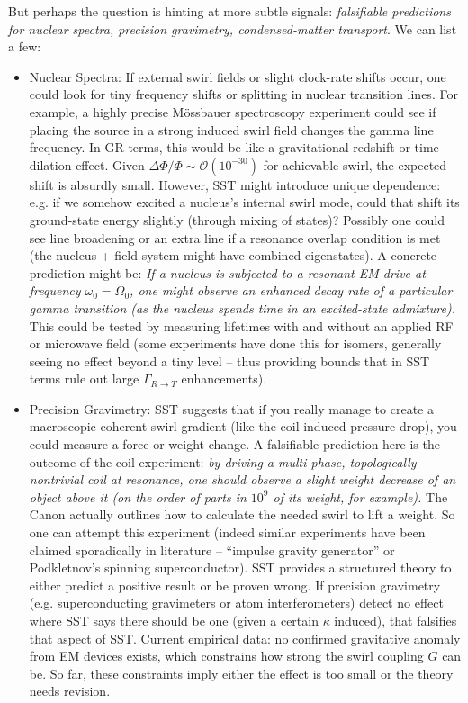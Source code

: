 \documentclass[11pt]{article}
\begin{document}
But perhaps the question is hinting at more subtle signals: \textit{falsifiable predictions for nuclear spectra, precision gravimetry, condensed-matter transport}. We can list a few:


\begin{itemize}

\item 
Nuclear Spectra: If external swirl fields or slight clock-rate shifts occur, one could look for tiny frequency shifts or splitting in nuclear transition lines. For example, a highly precise Mössbauer spectroscopy experiment could see if placing the source in a strong induced swirl field changes the gamma line frequency. In GR terms, this would be like a gravitational redshift or time-dilation effect. Given $\Delta\Phi/\Phi \sim \mathcal{O}(10^{-30})$ for achievable swirl, the expected shift is absurdly small. However, SST might introduce unique dependence: e.g. if we somehow excited a nucleus’s internal swirl mode, could that shift its ground-state energy slightly (through mixing of states)? Possibly one could see line broadening or an extra line if a resonance overlap condition is met (the nucleus + field system might have combined eigenstates). A concrete prediction might be: \textit{If a nucleus is subjected to a resonant EM drive at frequency $\omega_0 = \Omega_0$, one might observe an enhanced decay rate of a particular gamma transition (as the nucleus spends time in an excited-state admixture).} This could be tested by measuring lifetimes with and without an applied RF or microwave field (some experiments have done this for isomers, generally seeing no effect beyond a tiny level – thus providing bounds that in SST terms rule out large $\Gamma_{R\to T}$ enhancements).




\item 
Precision Gravimetry: SST suggests that if you really manage to create a macroscopic coherent swirl gradient (like the coil-induced pressure drop), you could measure a force or weight change. A falsifiable prediction here is the outcome of the coil experiment: \textit{by driving a multi-phase, topologically nontrivial coil at resonance, one should observe a slight weight decrease of an object above it (on the order of parts in $10^9$ of its weight, for example).} The Canon actually outlines how to calculate the needed swirl to lift a weight. So one can attempt this experiment (indeed similar experiments have been claimed sporadically in literature – “impulse gravity generator” or Podkletnov’s spinning superconductor). SST provides a structured theory to either predict a positive result or be proven wrong. If precision gravimetry (e.g. superconducting gravimeters or atom interferometers) detect no effect where SST says there should be one (given a certain $\kappa$ induced), that falsifies that aspect of SST. Current empirical data: no confirmed gravitative anomaly from EM devices exists, which constrains how strong the swirl coupling $G$ can be. So far, these constraints imply either the effect is too small or the theory needs revision.





\end{itemize}
\end{document}
